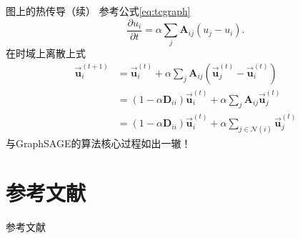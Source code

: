 \documentclass{beamer}
\begin{document}
\begin{frame}{图上的热传导（续）}
	参考公式\ref{eq:tcgraph}
	\begin{equation*}
		\frac{\partial u_i}{\partial t}=\alpha\sum\limits_j\textbf{A}_{ij}\left(u_j-u_i\right).
	\end{equation*}
	在时域上离散上式
	\begin{equation}
		\begin{aligned}
			\vec{\textbf{u}}_i^{\left(t+1\right)}&=\vec{\textbf{u}}_i^{\left(t\right)}+\alpha\sum\limits_j\textbf{A}_{ij}\left(\vec{\textbf{u}}_j^{\left(t\right)}-\vec{\textbf{u}}_i^{\left(t\right)}\right) \\
			&=\left(1-\alpha\textbf{D}_{ii}\right)\vec{\textbf{u}}_i^{\left(t\right)}+\alpha\sum\limits_j\textbf{A}_{ij}\vec{\textbf{u}}_j^{\left(t\right)} \\
			&=\left(1-\alpha\textbf{D}_{ii}\right)\vec{\textbf{u}}_i^{\left(t\right)}+\alpha\sum\limits_{j\in\mathcal{N}\left(i\right)}\vec{\textbf{u}}_j^{\left(t\right)}
		\end{aligned}
	\end{equation}
	与GraphSAGE的算法核心过程{\color{red}如出一辙}！
\end{frame}



\section{参考文献}

\begin{frame}[allowframebreaks]{参考文献}
	
	
\end{frame}



\backmatter
\end{document}
